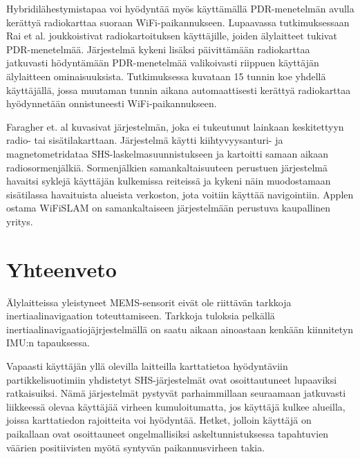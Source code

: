 Hybridilähestymistapaa voi hyödyntää myös käyttämällä PDR-menetelmän avulla
kerättyä radiokarttaa suoraan WiFi-paikannukseen. Lupaavassa
tutkimuksessaan Rai et al. \cite{rai2012} joukkoistivat radiokartoituksen
käyttäjille, joiden älylaitteet tukivat PDR-menetelmää. Järjestelmä
kykeni lisäksi päivittämään radiokarttaa jatkuvasti hödyntämään PDR-menetelmää
valikoivasti riippuen käyttäjän älylaitteen ominaisuuksista. Tutkimuksessa
kuvataan 15 tunnin koe yhdellä käyttäjällä, jossa muutaman tunnin aikana
automaattisesti kerättyä radiokarttaa hyödynnetään onnistuneesti
WiFi-paikannukseen. 

Faragher et. al \cite{faragher2012} kuvasivat järjestelmän, joka ei
tukeutunut lainkaan keskitettyyn radio- tai sisätilakarttaan. Järjestelmä
käytti kiihtyvyysanturi- ja magnetometridataa SHS-laskelmasuunnistukseen ja
kartoitti samaan aikaan radiosormenjälkiä. Sormenjälkien samankaltaisuuteen
perustuen järjestelmä havaitsi syklejä käyttäjän kulkemissa reiteissä
ja kykeni näin muodostamaan sisätilassa havaituista alueista
verkoston, jota voitiin käyttää navigointiin. Applen ostama WiFiSLAM
on samankaltaiseen järjestelmään perustuva kaupallinen yritys.

\section{Yhteenveto}

Älylaitteissa yleistyneet MEMS-sensorit eivät ole riittävän tarkkoja
inertiaalinavigaation toteuttamiseen. Tarkkoja tuloksia
pelkällä inertiaalinavigaatiojäjrjestelmällä
on saatu aikaan
ainoastaan kenkään kiinnitetyn IMU:n tapauksessa.

Vapaasti käyttäjän yllä olevilla laitteilla
karttatietoa hyödyntäviin partikkelisuotimiin yhdistetyt SHS-järjestelmät ovat
osoittautuneet lupaaviksi ratkaisuiksi.
Nämä järjestelmät pystyvät parhaimmillaan seuraamaan jatkuvasti liikkeessä
olevaa käyttäjää virheen kumuloitumatta, jos käyttäjä kulkee alueilla, joissa
karttatiedon rajoitteita voi hyödyntää. Hetket, jolloin käyttäjä on paikallaan
ovat osoittauneet ongelmallisiksi askeltunnistuksessa tapahtuvien
väärien positiivisten myötä syntyvän
paikannusvirheen takia.

